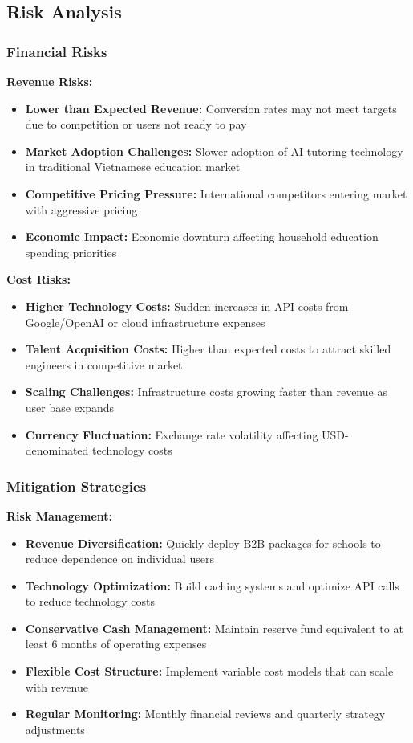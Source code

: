 \subsection{Risk Analysis}
\subsubsection{Financial Risks}
\textbf{Revenue Risks:}
\begin{itemize}
    \item \textbf{Lower than Expected Revenue:} Conversion rates may not meet targets due to competition or users not ready to pay
    \item \textbf{Market Adoption Challenges:} Slower adoption of AI tutoring technology in traditional Vietnamese education market
    \item \textbf{Competitive Pricing Pressure:} International competitors entering market with aggressive pricing
    \item \textbf{Economic Impact:} Economic downturn affecting household education spending priorities
\end{itemize}

\textbf{Cost Risks:}
\begin{itemize}
    \item \textbf{Higher Technology Costs:} Sudden increases in API costs from Google/OpenAI or cloud infrastructure expenses
    \item \textbf{Talent Acquisition Costs:} Higher than expected costs to attract skilled engineers in competitive market
    \item \textbf{Scaling Challenges:} Infrastructure costs growing faster than revenue as user base expands
    \item \textbf{Currency Fluctuation:} Exchange rate volatility affecting USD-denominated technology costs
\end{itemize}

\subsubsection{Mitigation Strategies}
\textbf{Risk Management:}
\begin{itemize}
    \item \textbf{Revenue Diversification:} Quickly deploy B2B packages for schools to reduce dependence on individual users
    \item \textbf{Technology Optimization:} Build caching systems and optimize API calls to reduce technology costs
    \item \textbf{Conservative Cash Management:} Maintain reserve fund equivalent to at least 6 months of operating expenses
    \item \textbf{Flexible Cost Structure:} Implement variable cost models that can scale with revenue
    \item \textbf{Regular Monitoring:} Monthly financial reviews and quarterly strategy adjustments
\end{itemize}

